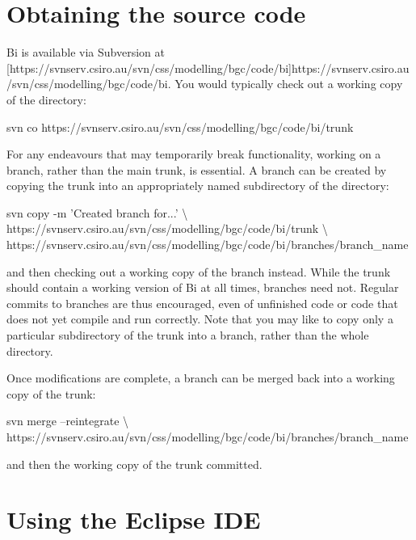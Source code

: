 \section{Obtaining the source code}

Bi is available via Subversion at
\hyperref[hyper][https://svnserv.csiro.au/svn/css/modelling/bgc/code/bi]{https://svnserv.csiro.au/svn/css/modelling/bgc/code/bi}. You
would typically check out a working copy of the  directory:
\begin{cmdcode}
svn co https://svnserv.csiro.au/svn/css/modelling/bgc/code/bi/trunk
\end{cmdcode}

For any endeavours that may temporarily break functionality, working on a
branch, rather than the main trunk, is essential. A branch can be created by
copying the trunk into an appropriately named subdirectory of the
 directory:
\begin{cmdcode}
svn copy -m 'Created branch for...' \textbackslash
  https://svnserv.csiro.au/svn/css/modelling/bgc/code/bi/trunk \textbackslash
  https://svnserv.csiro.au/svn/css/modelling/bgc/code/bi/branches/branch_name
\end{cmdcode}
and then checking out a working copy of the branch instead. While the trunk
should contain a working version of Bi at all times, branches need
not. Regular commits to branches are thus encouraged, even of unfinished code
or code that does not yet compile and run correctly. Note that you may like to
copy only a particular subdirectory of the trunk into a branch, rather than
the whole directory.

Once modifications are complete, a branch can be merged back into a working
copy of the trunk:
\begin{cmdcode}
svn merge --reintegrate \textbackslash
  https://svnserv.csiro.au/svn/css/modelling/bgc/code/bi/branches/branch_name
\end{cmdcode}
and then the working copy of the trunk committed.

\section{Using the Eclipse IDE}

